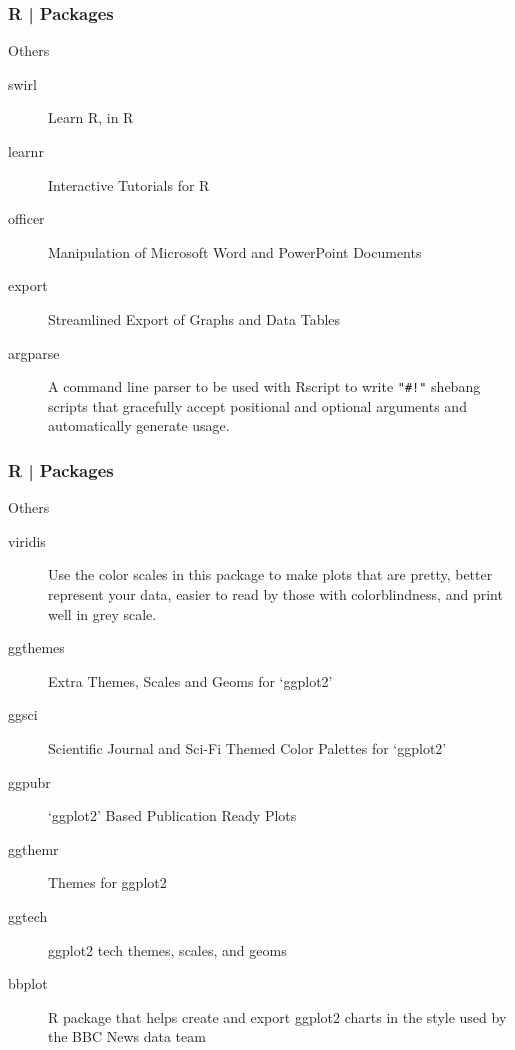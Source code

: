 \begin{frame}[fragile]
  \frametitle{R | Packages}
  \begin{block}{Others}
    \begin{description}
      \item[\alert{swirl}] Learn R, in R
      \item[learnr] Interactive Tutorials for R
      \item[officer] Manipulation of Microsoft Word and PowerPoint Documents
      \item[export] Streamlined Export of Graphs and Data Tables
      \item[\alert{argparse}] A command line parser to be used with Rscript to write \verb|"#!"| shebang scripts that gracefully accept positional and optional \alert{arguments} and automatically generate usage.
    \end{description}
  \end{block}
\end{frame}

\begin{frame}[fragile]
  \frametitle{R | Packages}
  \begin{block}{Others}
    \begin{description}
      \item[viridis] Use the color scales in this package to make plots that are pretty, better represent your data, easier to read by those with colorblindness, and print well in grey scale. 
      \item[ggthemes] Extra Themes, Scales and Geoms for `ggplot2'
      \item[\alert{ggsci}] Scientific Journal and Sci-Fi Themed Color Palettes for `ggplot2'
      \item[\alert{ggpubr}] `ggplot2' Based Publication Ready Plots
      \item[ggthemr] Themes for ggplot2
      \item[ggtech] ggplot2 tech themes, scales, and geoms
      \item[bbplot] R package that helps create and export ggplot2 charts in the style used by the BBC News data team
    \end{description}
  \end{block}
\end{frame}

